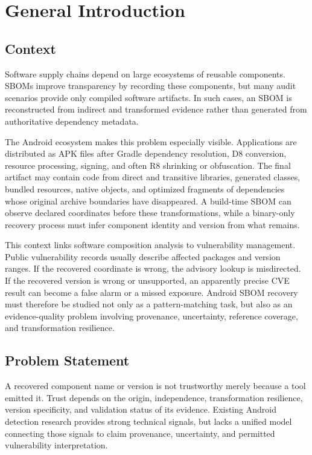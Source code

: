 \chapter{General Introduction}
\label{ch:master-introduction}

\section{Context}

Software supply chains depend on large ecosystems of reusable components.
SBOMs improve transparency by recording these components, but many audit
scenarios provide only compiled software artifacts. In such cases, an SBOM is
reconstructed from indirect and transformed evidence rather than generated
from authoritative dependency metadata.

The Android ecosystem makes this problem especially visible. Applications are
distributed as APK files after Gradle dependency resolution, D8 conversion,
resource processing, signing, and often R8 shrinking or obfuscation. The final
artifact may contain code from direct and transitive libraries, generated
classes, bundled resources, native objects, and optimized fragments of
dependencies whose original archive boundaries have disappeared. A build-time
SBOM can observe declared coordinates before these transformations, while a
binary-only recovery process must infer component identity and version from
what remains.

This context links software composition analysis to vulnerability management.
Public vulnerability records usually describe affected packages and version
ranges. If the recovered coordinate is wrong, the advisory lookup is
misdirected. If the recovered version is wrong or unsupported, an apparently
precise CVE result can become a false alarm or a missed exposure. Android
SBOM recovery must therefore be studied not only as a pattern-matching task,
but also as an evidence-quality problem involving provenance, uncertainty,
reference coverage, and transformation resilience.

\section{Problem Statement}

A recovered component name or version is not trustworthy merely because a
tool emitted it. Trust depends on the origin, independence, transformation
resilience, version specificity, and validation status of its evidence.
Existing Android detection research provides strong technical signals, but
lacks a unified model connecting those signals to claim provenance,
uncertainty, and permitted vulnerability interpretation.

